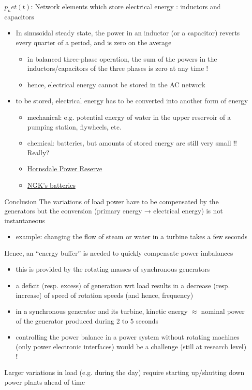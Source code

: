 \begin{frame}
$p_net(t)$: Network elements which store electrical energy : inductors and capacitors
\begin{itemize}
\item In sinusoidal steady state, the power in an inductor (or a capacitor) reverts every quarter of a period, and is zero on the average
\begin{itemize}
\item in balanced three-phase operation, the sum of the powers in the inductors/capacitors of the three phases is zero at any time !
\item hence, electrical energy cannot be stored in the AC network
\end{itemize}
\item to be stored, electrical energy has to be converted into another form of energy
\begin{itemize}
\item mechanical: e.g. potential energy of water in the upper reservoir of a pumping station, flywheels, etc.
\item chemical: batteries, but amounts of stored energy are still very small !! Really?
\item \href{https://en.wikipedia.org/wiki/Hornsdale_Power_Reserve}{Hornsdale Power Reserve}
\item \href{https://www.energy-storage.news/blogs/sponsored-ngks-nas-grid-scale-batteries-in-depth}{NGK's batteries}
\end{itemize}
\end{itemize}
\end{frame}

\begin{frame}
{Conclusion}
The variations of load power have to be compensated by the generators but the conversion (primary energy → electrical energy) is not instantaneous
\begin{itemize}
\item example: changing the flow of steam or water in a turbine takes a few seconds
\end{itemize}
Hence, an “energy buffer” is needed to quickly compensate power imbalances
\begin{itemize}
\item this is provided by the rotating masses of synchronous generators
\item a deficit (resp. excess) of generation wrt load results in a decrease (resp. increase) of speed of rotation speeds (and hence, frequency)
\item in a synchronous generator and its turbine, kinetic energy $\approx$ nominal power of the generator produced during 2 to 5 seconds
\item controlling the power balance in a power system without rotating machines (only power electronic interfaces) would be a challenge (still at research level) !
\end{itemize}
Larger variations in load (e.g. during the day) require starting up/shutting down power plants ahead of time
\end{frame}

